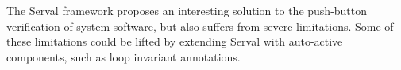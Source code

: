 \documentclass[11pt,a4paper]{article}
\newcommand{\serval}{Serval\xspace}
\begin{document}
The \serval framework proposes an interesting solution to the push-button
verification of system software, but also suffers from severe limitations. Some
of these limitations could be lifted by extending \serval with auto-active components,
such as loop invariant annotations.


%
%
%
%

\printbibliography
\end{document}
